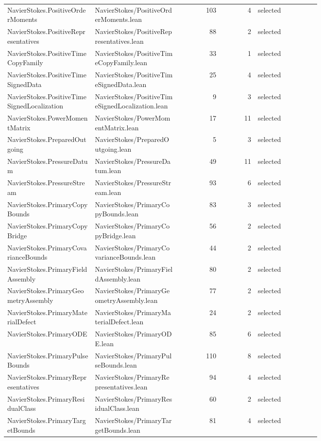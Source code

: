 \documentclass[10pt]{article}
\begin{document}
\begin{longtable}{p{0.28\linewidth}p{0.27\linewidth}r r p{0.20\linewidth}}
NavierStokes.PositiveOrderMoments & NavierStokes/PositiveOrderMoments.lean & 103 & 4 & selected\\
NavierStokes.PositiveRepresentatives & NavierStokes/PositiveRepresentatives.lean & 88 & 2 & selected\\
NavierStokes.PositiveTimeCopyFamily & NavierStokes/PositiveTimeCopyFamily.lean & 33 & 1 & selected\\
NavierStokes.PositiveTimeSignedData & NavierStokes/PositiveTimeSignedData.lean & 25 & 4 & selected\\
NavierStokes.PositiveTimeSignedLocalization & NavierStokes/PositiveTimeSignedLocalization.lean & 9 & 3 & selected\\
NavierStokes.PowerMomentMatrix & NavierStokes/PowerMomentMatrix.lean & 17 & 11 & selected\\
NavierStokes.PreparedOutgoing & NavierStokes/PreparedOutgoing.lean & 5 & 3 & selected\\
NavierStokes.PressureDatum & NavierStokes/PressureDatum.lean & 49 & 11 & selected\\
NavierStokes.PressureStream & NavierStokes/PressureStream.lean & 93 & 6 & selected\\
NavierStokes.PrimaryCopyBounds & NavierStokes/PrimaryCopyBounds.lean & 83 & 3 & selected\\
NavierStokes.PrimaryCopyBridge & NavierStokes/PrimaryCopyBridge.lean & 56 & 2 & selected\\
NavierStokes.PrimaryCovarianceBounds & NavierStokes/PrimaryCovarianceBounds.lean & 44 & 2 & selected\\
NavierStokes.PrimaryFieldAssembly & NavierStokes/PrimaryFieldAssembly.lean & 80 & 2 & selected\\
NavierStokes.PrimaryGeometryAssembly & NavierStokes/PrimaryGeometryAssembly.lean & 77 & 2 & selected\\
NavierStokes.PrimaryMaterialDefect & NavierStokes/PrimaryMaterialDefect.lean & 24 & 2 & selected\\
NavierStokes.PrimaryODE & NavierStokes/PrimaryODE.lean & 85 & 6 & selected\\
NavierStokes.PrimaryPulseBounds & NavierStokes/PrimaryPulseBounds.lean & 110 & 8 & selected\\
NavierStokes.PrimaryRepresentatives & NavierStokes/PrimaryRepresentatives.lean & 94 & 4 & selected\\
NavierStokes.PrimaryResidualClass & NavierStokes/PrimaryResidualClass.lean & 60 & 2 & selected\\
NavierStokes.PrimaryTargetBounds & NavierStokes/PrimaryTargetBounds.lean & 81 & 4 & selected\\

\end{longtable}
\end{document}

